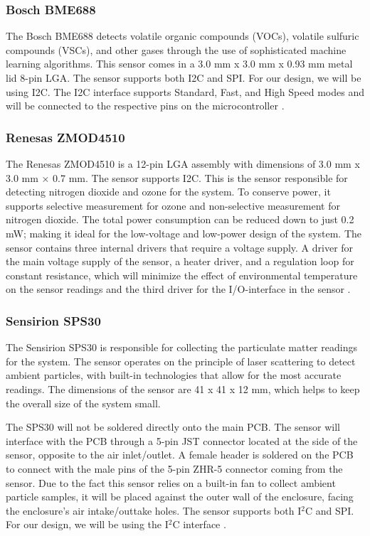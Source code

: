 \documentclass[conference]{IEEEtran}
\newcommand*{\iic}{I$^2$C\xspace}
\begin{document}
\subsubsection{Bosch BME688}
The Bosch BME688 detects volatile organic compounds (VOCs), volatile sulfuric compounds (VSCs), and other gases through the use of sophisticated machine learning algorithms. This sensor comes in a 3.0 mm x 3.0 mm x 0.93 mm metal lid 8-pin LGA. The sensor supports both I2C and SPI. For our design, we will be using I2C. The I2C interface supports Standard, Fast, and High Speed modes and will be connected to the respective pins on the microcontroller \cite{bme688-datasheet}.

\subsubsection{Renesas ZMOD4510}
The Renesas ZMOD4510 is a 12-pin LGA assembly with dimensions of 3.0 mm x 3.0 mm × 0.7 mm. The sensor supports I2C. This is the sensor responsible for detecting nitrogen dioxide and ozone for the system. To conserve power, it supports selective measurement for ozone and non-selective measurement for nitrogen dioxide. The total power consumption can be reduced down to just 0.2 mW; making it ideal for the low-voltage and low-power design of the system. The sensor contains three internal drivers that require a voltage supply. A driver for the main voltage supply of the sensor, a heater driver, and a regulation loop for constant resistance, which will minimize the effect of environmental temperature on the sensor readings and the third driver for the I/O-interface in the sensor \cite{ZMOD4510-datasheet}.

\subsubsection{Sensirion SPS30}
The Sensirion SPS30 is responsible for collecting the particulate matter readings for the system. The sensor operates on the principle of laser scattering to detect ambient particles, with built-in technologies that allow for the most accurate readings. The dimensions of the sensor are 41 x 41 x 12 mm, which helps to keep the overall size of the system small. 

The SPS30 will not be soldered directly onto the main PCB. The sensor will interface with the PCB through a 5-pin JST connector located at the side of the sensor, opposite to the air inlet/outlet. A female header is soldered on the PCB to connect with the male pins of the 5-pin ZHR-5 connector coming from the sensor. Due to the fact this sensor relies on a built-in fan to collect ambient particle samples, it will be placed against the outer wall of the enclosure, facing the enclosure's air intake/outtake holes. The sensor supports both \iic and SPI. For our design, we will be using the \iic interface \cite{sps30-datasheet}.
\end{document}
